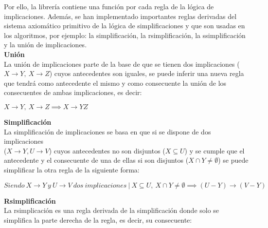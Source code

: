


Por ello, la librer\'ia contiene una funci\'on por cada regla de la l\'ogica de implicaciones. Adem\'as, se han implementado importantes reglas derivadas del sistema axiom\'atico primitivo de la l\'ogica de simplificaciones y que son usadas en los algoritmos, por ejemplo: la simplificaci\'on, la rsimplificaci\'on, la ssimplificaci\'on y la uni\'on de implicaciones.\\

\textbf{Uni\'on}\\
La uni\'on de implicaciones parte de la base de que se tienen dos implicaciones (\(X \to Y, \ X \to Z\)) cuyos antecedentes son iguales, se puede inferir una nueva regla que tendr\'a como antecedente el mismo y como consecuente la uni\'on de los consecuentes de ambas implicaciones, es decir:

\begin{center}
    \(X \to Y, \ X \to Z \implies X \to YZ \)
\end{center}


\bigskip
\textbf{Simplificaci\'on}\\
La simplificaci\'on de implicaciones se basa en que si se dispone de dos implicaciones \\ (\(X \to Y , U \to V\)) cuyos antecedentes no son disjuntos (\(X \subseteq U\)) y se cumple que el antecedente y el consecuente de una de ellas si son disjuntos (\(X \cap Y \neq \emptyset\)) se puede simplificar la otra regla de la siguiente forma:

\begin{center}
    \(Siendo \ X \to Y \ y \ U\to V \ dos \ implicaciones \ | \ X \subseteq U, \ X \cap Y \neq \emptyset \implies (U - Y) \to (V - Y)\)
\end{center}


\bigskip
\textbf{Rsimplificaci\'on}\\
La rsimplicaci\'on es una regla derivada de la simplificaci\'on donde solo se simplifica la parte derecha de la regla, es decir, su consecuente:

